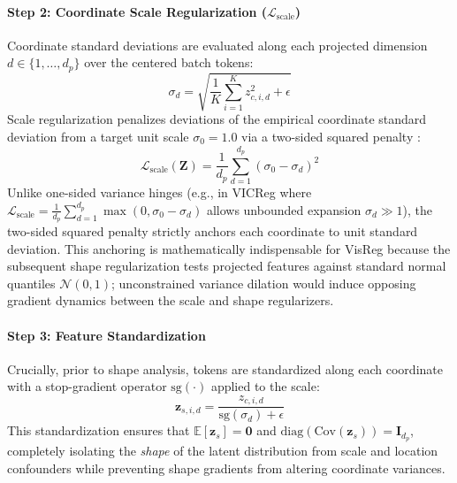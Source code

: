 \documentclass{article}
\begin{document}
\paragraph{Step 2: Coordinate Scale Regularization ($\mathcal{L}_{\text{scale}}$)}
Coordinate standard deviations are evaluated along each projected dimension $d \in \{1, \dots, d_p\}$ over the centered batch tokens:
\begin{equation}
    \sigma_d = \sqrt{\frac{1}{K} \sum_{i=1}^K z_{c, i, d}^2 + \epsilon}
\end{equation}
Scale regularization penalizes deviations of the empirical coordinate standard deviation from a target unit scale $\sigma_0 = 1.0$ via a two-sided squared penalty \citep{wu2026visreg}:
\begin{equation}
    \mathcal{L}_{\text{scale}}(\mathbf{Z}) = \frac{1}{d_p} \sum_{d=1}^{d_p} (\sigma_0 - \sigma_d)^2
\end{equation}
Unlike one-sided variance hinges (e.g., in VICReg \citep{bardes2021vicreg} where $\mathcal{L}_{\text{scale}} = \frac{1}{d_p} \sum_{d=1}^{d_p} \max(0, \sigma_0 - \sigma_d)$ allows unbounded expansion $\sigma_d \gg 1$), the two-sided squared penalty strictly anchors each coordinate to unit standard deviation. This anchoring is mathematically indispensable for VisReg because the subsequent shape regularization tests projected features against standard normal quantiles $\mathcal{N}(0, 1)$; unconstrained variance dilation would induce opposing gradient dynamics between the scale and shape regularizers.

\paragraph{Step 3: Feature Standardization}
Crucially, prior to shape analysis, tokens are standardized along each coordinate with a stop-gradient operator $\text{sg}(\cdot)$ applied to the scale:
\begin{equation}
    \mathbf{z}_{s, i, d} = \frac{z_{c, i, d}}{\text{sg}(\sigma_d) + \epsilon}
\end{equation}
This standardization ensures that $\mathbb{E}[\mathbf{z}_s] = \mathbf{0}$ and $\text{diag}(\text{Cov}(\mathbf{z}_s)) = \mathbf{I}_{d_p}$, completely isolating the \emph{shape} of the latent distribution from scale and location confounders while preventing shape gradients from altering coordinate variances.
\end{document}
